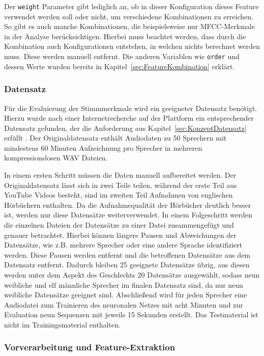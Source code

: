 Der \texttt{weight} Parameter gibt lediglich an, ob in dieser Konfiguration dieses Feature verwendet werden soll oder nicht, um verschiedene Kombinationen zu erreichen.
So gibt es auch manche Kombinationen, die beispielsweise nur \ac{MFCC}-Merkmale in der Analyse berücksichtigen.
Hierbei muss beachtet werden, dass durch die Kombination auch Konfigurationen entstehen, in welchen nichts berechnet werden muss.
Diese werden manuell entfernt.
Die anderen Variablen wie \texttt{order} und dessen Werte wurden bereits in Kapitel~\ref{sec:FeatureKombination} erklärt.

\subsubsection{Datensatz}
Für die Evaluierung der Stimmmerkmale wird ein geeigneter Datensatz benötigt.
Hierzu wurde nach einer Internetrecherche auf der Plattform  ein entsprechender Datensatz gefunden, der die Anforderung aus Kapitel~\ref{sec:KonzeptDatensatz} erfüllt \autocite[vgl.][]{jain_speaker_2019}. 
Der Originaldatensatz enthält Audiodaten zu 50 Sprechern mit mindestens 60 Minuten Aufzeichnung pro Sprecher in mehreren kompressionslosen WAV Dateien.

In einem ersten Schritt müssen die Daten manuell aufbereitet werden.
Der Originaldatensatz lässt sich in zwei Teile teilen, während der erste Teil aus YouTube Videos besteht, sind im zweiten Teil Aufnahmen von englischen Hörbüchern enthalten.
Da die Aufnahmequalität der Hörbücher deutlich besser ist, werden nur diese Datensätze weiterverwendet.
In einem Folgeschritt werden die einzelnen Dateien der Datensätze zu einer Datei zusammengefügt und genauer betrachtet.
Hierbei können längere Pausen und Abweichungen der Datensätze, wie z.B. mehrere Sprecher oder eine andere Sprache identifiziert werden.
Diese Pausen werden entfernt und die betroffenen Datensätze aus dem Datensatz entfernt.
Dadurch bleiben 25 geeignete Datensätze übrig, aus diesen werden unter dem Aspekt des Geschlechts 20 Datensätze ausgewählt, sodass neun weibliche und elf männliche Sprecher im finalen Datensatz sind, da nur neun weibliche Datensätze geeignet sind.
Abschließend wird für jeden Sprecher eine Audiodatei zum Trainieren des neuronalen Netzes mit acht Minuten und zur Evaluation neun Sequenzen mit jeweils 15 Sekunden erstellt.
Das Testmaterial ist nicht im Trainingsmaterial enthalten.

\subsubsection{Vorverarbeitung und Feature-Extraktion}\label{section:umsetzung-versuch-vorverarbeitung}

